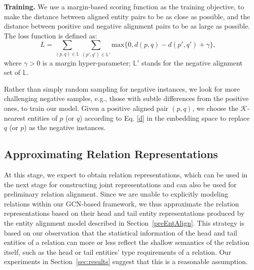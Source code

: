 \documentclass[11pt,a4paper]{article}
\newcommand\cparagraph[1]{\vspace{1mm}\noindent\textbf{#1.}}
\begin{document}
\cparagraph{Training} 
We use a margin-based scoring function as the training objective, to make the distance between aligned entity pairs to be as close as possible, and the distance between positive and negative alignment pairs to be as large as possible. The loss function is defined as:
\begin{equation}
\label{trainingobj}
L=\sum\limits_{(p,q)\in \mathbb{L}}\sum\limits_{(p',q')\in \mathbb{L'}}\mathrm{max}\{0,d(p,q)-d(p',q')+\gamma\},
\end{equation}
where $\gamma>0$ is a margin hyper-parameter; $\mathbb{L'}$ stands for the negative alignment set of $\mathbb{L}$.

Rather than simply random sampling for negative instances, we look for more challenging negative samples, e.g., those with subtle differences from the positive ones, to train our model.
Given a positive aligned pair $(p,q)$,  we choose the $\mathcal{K}$-nearest
entities of $p$ (or $q$) according to Eq. \ref{d} in the embedding space to replace $q$ (or $p$) as the negative instances. 

\subsection{Approximating Relation Representations}
\label{subsection:relationAlign}
At this stage, we expect to obtain relation representations, which can be used in the next stage for constructing joint representations and can also be used for preliminary relation alignment.
Since we are unable to explicitly modeling relations within our GCN-based framework, we thus approximate the relation representations based
on their head and tail entity representations produced by the entity alignment model described in Section~\ref{preEntAlign}. This strategy is
based on our observation that the statistical information of the head and tail entities of a relation can more or less reflect the shallow
semantics of the relation itself, such as the head or tail entities' type requirements of a relation. Our experiments in Section~\ref{sec:results} suggest that
this is a reasonable assumption.
\end{document}
